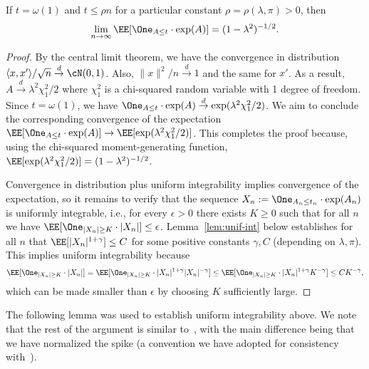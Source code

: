 \documentclass[11pt]{article}
\begin{document}
\begin{lemma}\label{lem:L-term-2}
If $t=\omega(1)$ and $t \le \rho n$ for a particular constant $\rho = \rho(\lambda,\pi) > 0$, then
\[ \lim_{n \to \infty} \EE[\One_{A \le t} \cdot \exp(A)] = (1-\lambda^2)^{-1/2}. \]
\end{lemma}
\begin{proof}
By the central limit theorem, we have the convergence in distribution $\langle x,x' \rangle/\sqrt{n} \stackrel{d}{\to} \cN(0,1)$. Also, $\|x\|^2/n \stackrel{d}{\to} 1$ and the same for $x'$. As a result, $A \stackrel{d}{\to} \lambda^2 \chi_1^2/2$ where $\chi_1^2$ is a chi-squared random variable with 1 degree of freedom. Since $t = \omega(1)$, we have $\One_{A \le t} \cdot \exp(A) \stackrel{d}{\to} \exp(\lambda^2 \chi_1^2/2)$. We aim to conclude the corresponding convergence of the expectation $\EE[\One_{A \le t} \cdot \exp(A)] \to \EE[\exp(\lambda^2 \chi_1^2/2)]$. This completes the proof because, using the chi-squared moment-generating function, $\EE[\exp(\lambda^2 \chi_1^2/2)] = (1-\lambda^2)^{-1/2}$.

Convergence in distribution plus uniform integrability implies convergence of the expectation, so it remains to verify that the sequence $X_n := \One_{A_n \le t_n} \cdot \exp(A_n)$ is uniformly integrable, i.e., for every $\epsilon > 0$ there exists $K \ge 0$ such that for all $n$ we have $\EE[\One_{|X_n| \ge K} \cdot |X_n|] \le \epsilon$. Lemma~\ref{lem:unif-int} below establishes for all $n$ that $\EE[|X_n|^{1+\gamma}] \le C$ for some positive constants $\gamma,C$ (depending on $\lambda,\pi$). This implies uniform integrability because
\[ \EE[\One_{|X_n| \ge K} \cdot |X_n|] = \EE[\One_{|X_n| \ge K} \cdot |X_n|^{1+\gamma} |X_n|^{-\gamma}] \le \EE[\One_{|X_n| \ge K} \cdot |X_n|^{1+\gamma} K^{-\gamma}] \le CK^{-\gamma}, \]
which can be made smaller than $\epsilon$ by choosing $K$ sufficiently large.
\end{proof}

The following lemma was used to establish uniform integrability above. We note that the rest of the argument is similar to~\cite[Theorem~3.9]{ld-notes}, with the main difference being that we have normalized the spike (a convention we have adopted for consistency with~\cite{weak-wigner}).
\end{document}
